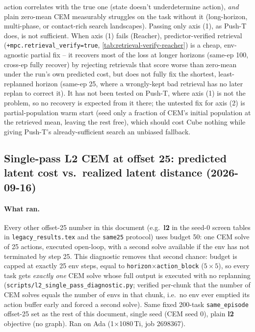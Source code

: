 \documentclass[11pt]{article}
\begin{document}
action correlates with the true one (state doesn't underdetermine action), \emph{and}
plain zero-mean CEM measurably struggles on the task without it (long-horizon, multi-phase,
or contact-rich search landscapes). Passing only axis (1), as Push-T does, is not sufficient.
When axis (1) fails (Reacher), predictor-verified retrieval
(\texttt{+mpc.retrieval\_verify=true}, \cref{tab:retrieval-verify-reacher}) is a cheap,
env-agnostic partial fix -- it recovers most of the loss at longer horizons (same-ep 100,
cross-ep fully recover) by rejecting retrievals that score worse than zero-mean under the
run's own predicted cost, but does not fully fix the shortest, least-replanned horizon
(same-ep 25, where a wrongly-kept bad retrieval has no later replan to correct it). It has not
been tested on Push-T, where axis (1) is not the problem, so no recovery is expected from it
there; the untested fix for axis (2) is partial-population warm start (seed only a fraction of
CEM's initial population at the retrieved mean, leaving the rest free), which should cost
Cube nothing while giving Push-T's already-sufficient search an unbiased fallback.

\subsection{Single-pass L2 CEM at offset 25: predicted latent cost vs.\ realized latent
distance (2026-09-16)}
\paragraph{What ran.} Every other offset-25 number in this document (e.g.\ \textbf{l2} in
the seed-0 screen tables in \texttt{legacy\_results.tex} and the \texttt{same25} protocol) uses budget 50: one CEM solve of
25 actions, executed open-loop, with a second solve available if the env has not terminated
by step 25. This diagnostic removes that second chance: budget is capped at exactly 25 env
steps, equal to \texttt{horizon}$\times$\texttt{action\_block} ($5\times5$), so every task
gets \emph{exactly one} CEM solve whose full output is executed with no replanning
(\texttt{scripts/l2\_single\_pass\_diagnostic.py}; verified per-chunk that the number of CEM
solves equals the number of envs in that chunk, i.e.\ no env ever emptied its action buffer
early and forced a second solve). Same fixed 200-task \texttt{same\_episode} offset-25 set as
the rest of this document, single seed (CEM seed 0), plain \textbf{l2} objective (no graph).
Ran on Ada (1$\times$1080\,Ti, job 2698367).
\end{document}
